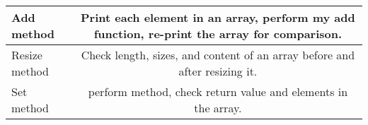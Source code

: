 \documentclass[a4paper,11pt]{article}
\theoremstyle{mytheor}
\begin{document}
\begin{tabular}{l|c}
  Add method & Print each element in an array, perform my add function, re-print the array for comparison.  \\
  \hline
  Resize method & Check length, sizes, and content of an array before and after resizing it. \\
  \hline
  Set method & perform method, check return value and elements in the array.
\end{tabular}





















\clearpage
\end{document}
